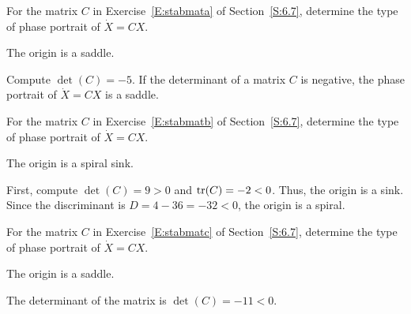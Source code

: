 \documentclass{ximera}
\begin{document}
\begin{exercise} \label{c6.8.1a}
For the matrix $C$ in Exercise~\ref{E:stabmata} of Section~\ref{S:6.7},
determine the type of phase portrait of $\dot{X}=CX$.

\begin{solution}
\ans The origin is a saddle.

\soln Compute $\det(C) = -5$.  If the determinant of a matrix $C$ is
negative, the phase portrait of $\dot{X} = CX$ is a saddle.

\end{solution}
\end{exercise}
\begin{exercise} \label{c6.8.1b}
For the matrix $C$ in Exercise~\ref{E:stabmatb} of Section~\ref{S:6.7}, 
determine the type of phase portrait of $\dot{X}=CX$.

\begin{solution}
\ans The origin is a spiral sink.

\soln First, compute $\det(C) = 9 > 0$ and ${\rm tr}(C) = -2 < 0$.  Thus,
the origin is a sink.  Since the discriminant is $D = 4 - 36 = -32 < 0$,
the origin is a spiral.

\end{solution}
\end{exercise}
\begin{exercise} \label{c6.8.1c}
For the matrix $C$ in Exercise~\ref{E:stabmatc}  of Section~\ref{S:6.7},
determine the type of phase portrait of $\dot{X}=CX$.

\begin{solution}
\ans The origin is a saddle.

\soln The determinant of the matrix is $\det(C) = -11 < 0$.

\end{solution}
\end{exercise}
\end{document}
